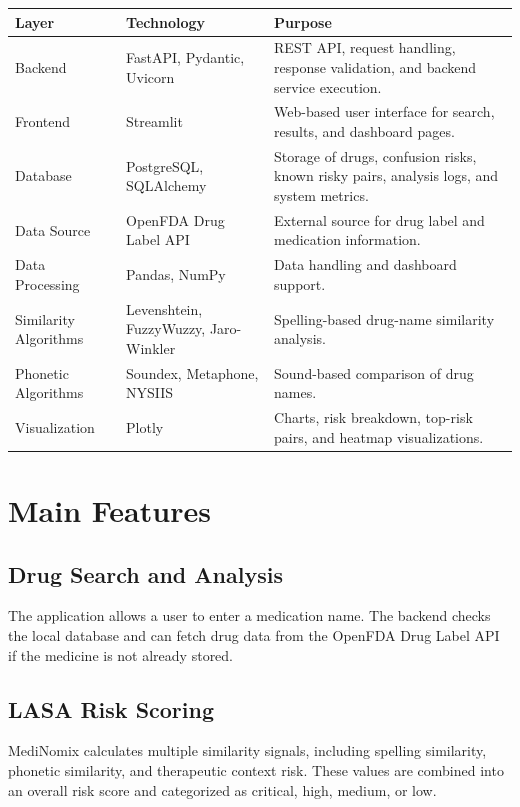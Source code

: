 \documentclass[12pt,a4paper]{article}
\begin{document}
\begin{table}[h!]
\centering
{}
\begin{tabularx}{\textwidth}{p{3.2cm}p{4.4cm}Y}
\toprule
{}
\textbf{Layer} & \textbf{Technology} & \textbf{Purpose} \\
\midrule
Backend & FastAPI, Pydantic, Uvicorn & REST API, request handling, response validation, and backend service execution. \\
Frontend & Streamlit & Web-based user interface for search, results, and dashboard pages. \\
Database & PostgreSQL, SQLAlchemy & Storage of drugs, confusion risks, known risky pairs, analysis logs, and system metrics. \\
Data Source & OpenFDA Drug Label API & External source for drug label and medication information. \\
Data Processing & Pandas, NumPy & Data handling and dashboard support. \\
Similarity Algorithms & Levenshtein, FuzzyWuzzy, Jaro-Winkler & Spelling-based drug-name similarity analysis. \\
Phonetic Algorithms & Soundex, Metaphone, NYSIIS & Sound-based comparison of drug names. \\
Visualization & Plotly & Charts, risk breakdown, top-risk pairs, and heatmap visualizations. \\
\bottomrule
\end{tabularx}
\end{table}

\section{Main Features}

\subsection{Drug Search and Analysis}

The application allows a user to enter a medication name. The backend checks the local database and can fetch drug data from the OpenFDA Drug Label API if the medicine is not already stored.

\subsection{LASA Risk Scoring}

MediNomix calculates multiple similarity signals, including spelling similarity, phonetic similarity, and therapeutic context risk. These values are combined into an overall risk score and categorized as critical, high, medium, or low.
\end{document}

